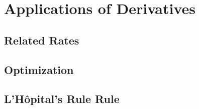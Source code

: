 \chapter{Applications of Derivatives}

\section{Related Rates}

\section{Optimization}

\section{L'H\^{o}pital's Rule Rule}
